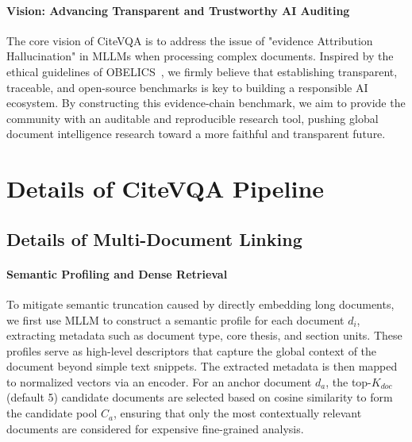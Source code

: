 \documentclass{llmxive}
\begin{document}
{{{\paragraph{Vision: Advancing Transparent and Trustworthy AI Auditing} The core vision of CiteVQA is to address the issue of "evidence Attribution Hallucination" in MLLMs when processing complex documents. Inspired by the ethical guidelines of OBELICS~\citep{laurencon2023obelics}, we firmly believe that establishing transparent, traceable, and open-source benchmarks is key to building a responsible AI ecosystem. By constructing this evidence-chain benchmark, we aim to provide the community with an auditable and reproducible research tool, pushing global document intelligence research toward a more faithful and transparent future.



\section{Details of CiteVQA Pipeline}
\label{Appendix: Details of CiteVQA Pipeline}

\subsection{Details of Multi-Document Linking}
\label{Appendix: Details of Multi-Document Linking}

\paragraph{Semantic Profiling and Dense Retrieval}
To mitigate semantic truncation caused by directly embedding long documents, we first use MLLM to construct a semantic profile for each document $d_i$, extracting metadata such as document type, core thesis, and section units. These profiles serve as high-level descriptors that capture the global context of the document beyond simple text snippets. The extracted metadata is then mapped to normalized vectors via an encoder. For an anchor document $d_a$, the top-$K_{doc}$ (default 5) candidate documents are selected based on cosine similarity to form the candidate pool $C_a$, ensuring that only the most contextually relevant documents are considered for expensive fine-grained analysis.

}}}
\end{document}
